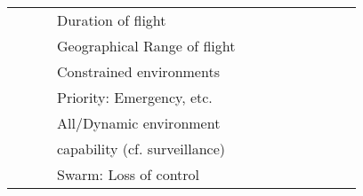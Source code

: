 \documentclass{report}
\begin{document}
\begin{centering}
\begin{longtable}{|l|l|l|l|c|c|c|c|c|c|c|c|}
   & & & Duration of flight & & & & & & & & \\\cline{4-4}
   & & & Geographical Range of flight & & & & & & & & \\\cline{4-4}
   & & & Constrained environments & & & & & & & & \\\cline{4-4}
   & & & Priority: Emergency, etc. & & & & & & & & \\\cline{4-4}
   & & & All/Dynamic environment & & & & & & & & \\
   & & & capability (cf. surveillance) & & & & & & & & \\\cline{4-4}
   & & & Swarm: Loss of control & & & & & & & & \\\cline{1-4}

\hline
\end{longtable}
\end{centering}
% 
% 
\end{document}
